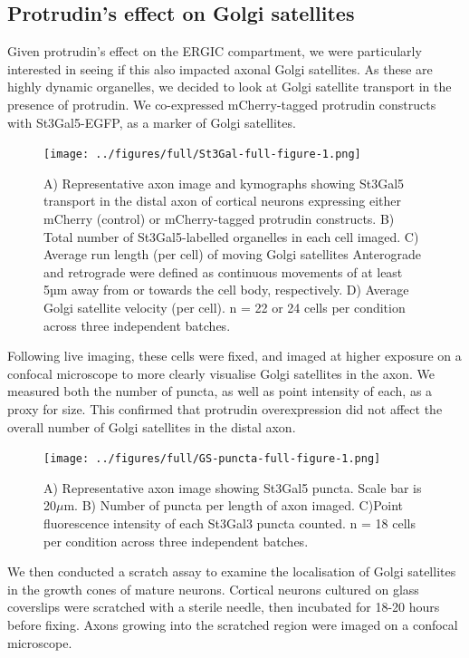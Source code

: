 \documentclass[
  12pt,
  a4paper,
]{book}
\begin{document}
\hypertarget{protrudins-effect-on-golgi-satellites}{%
\subsection{Protrudin's effect on Golgi satellites}\label{protrudins-effect-on-golgi-satellites}}

Given protrudin's effect on the ERGIC compartment, we were particularly interested in seeing if this also impacted axonal Golgi satellites. As these are highly dynamic organelles, we decided to look at Golgi satellite transport in the presence of protrudin. We co-expressed mCherry-tagged protrudin constructs with St3Gal5-EGFP, as a marker of Golgi satellites.

\begin{figure}
\centering
\texttt{[image: ../figures/full/St3Gal-full-figure-1.png]}
\caption{\label{fig:St3Gal-full-figure}A) Representative axon image and kymographs showing St3Gal5 transport in the distal axon of cortical neurons expressing either mCherry (control) or mCherry-tagged protrudin constructs. B) Total number of St3Gal5-labelled organelles in each cell imaged. C) Average run length (per cell) of moving Golgi satellites Anterograde and retrograde were defined as continuous movements of at least 5µm away from or towards the cell body, respectively. D) Average Golgi satellite velocity (per cell). n = 22 or 24 cells per condition across three independent batches.}
\end{figure}

Following live imaging, these cells were fixed, and imaged at higher exposure on a confocal microscope to more clearly visualise Golgi satellites in the axon. We measured both the number of puncta, as well as point intensity of each, as a proxy for size. This confirmed that protrudin overexpression did not affect the overall number of Golgi satellites in the distal axon.

\begin{figure}
\centering
\texttt{[image: ../figures/full/GS-puncta-full-figure-1.png]}
\caption{\label{fig:GS-puncta-full-figure}A) Representative axon image showing St3Gal5 puncta. Scale bar is 20\(\mu\)m. B) Number of puncta per length of axon imaged. C)Point fluorescence intensity of each St3Gal3 puncta counted. n = 18 cells per condition across three independent batches.}
\end{figure}

We then conducted a scratch assay to examine the localisation of Golgi satellites in the growth cones of mature neurons. Cortical neurons cultured on glass coverslips were scratched with a sterile needle, then incubated for 18-20 hours before fixing. Axons growing into the scratched region were imaged on a confocal microscope.
\end{document}

